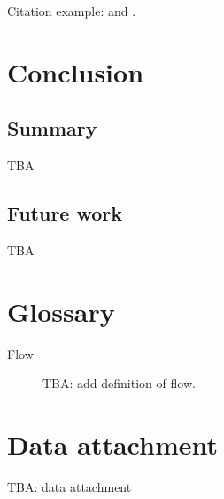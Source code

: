 \documentclass[
    digital,    %
    oneside,    %
    color,
    11pt,
    nocover,
    notable,
    nolof,
    nolot,
    final
]{fithesis3}
\begin{document}
Citation example: \cite{adaptive-practice} and \cite{flow}.


\chapter{Conclusion}
\label{chap:conclusion}

\section{Summary}
\label{sec:conclusion.summary}

TBA

\section{Future work}
\label{sec:conclusion.future-work}

TBA



\printbibliography[heading=bibintoc]

\appendix

\chapter{Glossary}
\label{chap:glossary}

\begin{description}
    \item[Flow] TBA: add definition of flow.
\end{description}

\chapter{Data attachment}
\label{chap:data}

TBA: data attachment
\end{document}
